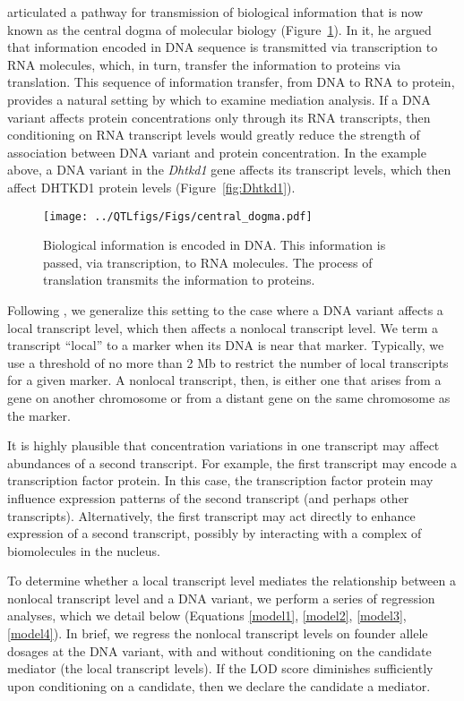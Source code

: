 \documentclass[oneside]{book}
\begin{document}
\citet{crick1958protein} articulated a pathway for transmission of biological information that is now known as the central dogma of molecular biology (Figure~\ref{fig:dogma}). In it, he argued that information encoded in DNA sequence is transmitted via transcription to RNA molecules, which, in turn, transfer the information to proteins via translation. This sequence of information transfer, from DNA to RNA to protein, provides a natural setting by which to examine mediation analysis. If a DNA variant affects protein concentrations only through its RNA transcripts, then conditioning on RNA transcript levels would greatly reduce the strength of association between DNA variant and protein concentration. In the example above, a DNA variant in the \emph{Dhtkd1} gene affects its transcript levels, which then affect DHTKD1 protein levels (Figure~\ref{fig:Dhtkd1}).


\begin{figure}
  \centering
  \texttt{[image: ../QTLfigs/Figs/central\_dogma.pdf]}
  \caption{Biological information is encoded in DNA. This information is passed, via transcription, to RNA molecules. The process of translation transmits the information to proteins.}\label{fig:dogma}
\end{figure}




Following \citet{keller2018genetic}, we generalize this setting to the case where a DNA variant affects a local transcript level, which then affects a nonlocal transcript level. We term a transcript ``local'' to a marker when its DNA is near that marker. Typically, we use a threshold of no more than 2 Mb to restrict the number of local transcripts for a given marker. A nonlocal transcript, then, is either one that arises from a gene on another chromosome or from a distant gene on the same chromosome as the marker.

It is highly plausible that concentration variations in one transcript may affect abundances of a second transcript. For example, the first transcript may encode a transcription factor protein. In this case, the transcription factor protein may influence expression patterns of the second transcript (and perhaps other transcripts). Alternatively, the first transcript may act directly to enhance expression of a second transcript, possibly by interacting with a complex of biomolecules in the nucleus.





To determine whether a local transcript level mediates the relationship between a nonlocal transcript level and a DNA variant, we perform a series of regression analyses, which we detail below (Equations \ref{model1}, \ref{model2}, \ref{model3}, \ref{model4}). In brief, we regress the nonlocal transcript levels on founder allele dosages at the DNA variant, with and without conditioning on the candidate mediator (the local transcript levels). If the LOD score diminishes sufficiently upon conditioning on a candidate, then we declare the candidate a mediator.
\end{document}

